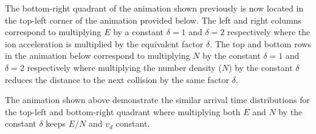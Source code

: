 \documentclass[10pt,a4paper,final]{article}
\begin{document}
The bottom-right quadrant of the animation shown previously is now located in the top-left corner of the animation provided below. 
The left and right columns correspond to multiplying $E$ by a constant $\delta=1$ and $\delta=2$ respectively where the ion acceleration is multiplied by the equivalent factor $\delta$. The top and bottom rows in the animation below correspond to multiplying $N$ by the constant $\delta=1$ and $\delta=2$ respectively where multiplying the number density ($N$) by the constant $\delta$ reduces the distance to the next collision by the same factor $\delta$. 




The animation shown above demonstrate the similar arrival time distributions for the top-left and bottom-right quadrant where multiplying both $E$ and $N$ by the constant $\delta$ keeps $E/N$ and $v_d$ constant. 





	
\end{document}
